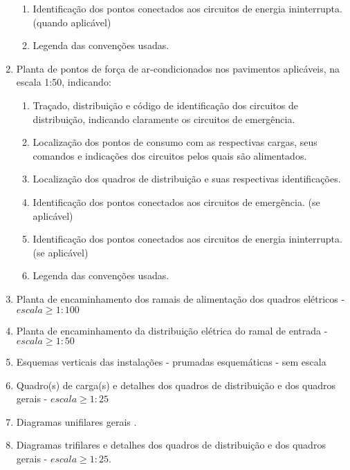 \begin{enumerate}
\begin{enumerate}
		\item Identificação dos pontos conectados aos circuitos de energia ininterrupta. (quando aplicável)
		
		\item Legenda das convenções usadas.
	\end{enumerate}
	
	
	\item Planta de pontos de força de ar-condicionados nos pavimentos aplicáveis, na escala 1:50, indicando:
	\begin{enumerate}
		\item Traçado, distribuição e código de identificação dos circuitos de distribuição, indicando claramente os circuitos de emergência.
		
		\item Localização dos pontos de consumo com as respectivas cargas, seus comandos e indicações dos circuitos pelos quais são alimentados.
		
		\item Localização dos quadros de distribuição e suas respectivas identificações.
		
		\item Identificação dos pontos conectados aos circuitos de emergência. (se aplicável)
		
		\item Identificação dos pontos conectados aos circuitos de energia ininterrupta. (se aplicável)
		
		\item Legenda das convenções usadas.
	\end{enumerate}
	
	\item Planta de encaminhamento dos ramais de alimentação dos quadros elétricos - $escala \geq 1:100$
	
	\item Planta de encaminhamento da distribuição elétrica do ramal de entrada - $escala \geq 1:50$
	
	\item Esquemas verticais das instalações - prumadas esquemáticas - sem escala
	
	\item Quadro(s) de carga(s) e detalhes dos quadros de distribuição e dos quadros gerais - $escala \geq 1:25$
	
	\item Diagramas unifilares gerais .
	
	\item Diagramas trifilares e detalhes dos quadros de distribuição e dos quadros gerais - $escala \geq 1:25$.
	

\end{enumerate}
